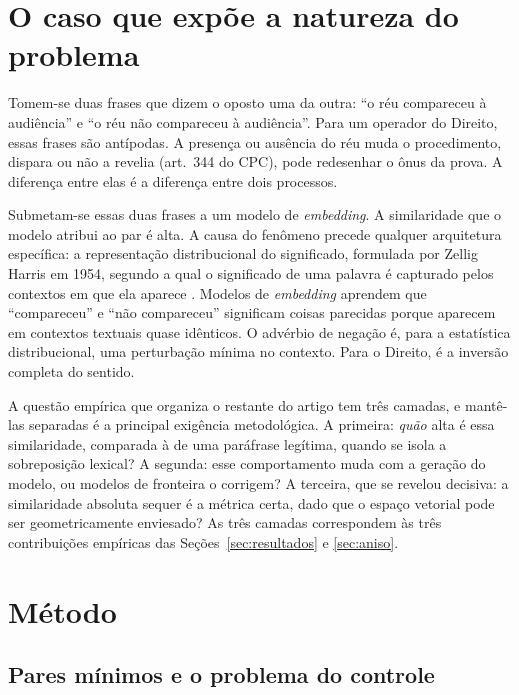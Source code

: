 \documentclass[11pt]{article}
\begin{document}
\section{O caso que expõe a natureza do problema}
\label{sec:caso}

Tomem-se duas frases que dizem o oposto uma da outra: ``o réu compareceu à
audiência'' e ``o réu não compareceu à audiência''. Para um operador do Direito,
essas frases são antípodas. A presença ou ausência do réu muda o procedimento,
dispara ou não a revelia (art.~344 do CPC), pode redesenhar o ônus da prova. A
diferença entre elas é a diferença entre dois processos.

Submetam-se essas duas frases a um modelo de \textit{embedding}. A similaridade
que o modelo atribui ao par é alta. A causa do fenômeno precede qualquer
arquitetura específica: a representação distribucional do significado, formulada
por Zellig Harris em 1954, segundo a qual o significado de uma palavra é capturado
pelos contextos em que ela aparece \cite{harris1954}. Modelos de \textit{embedding}
aprendem que ``compareceu'' e ``não compareceu'' significam coisas parecidas
porque aparecem em contextos textuais quase idênticos. O advérbio de negação é,
para a estatística distribucional, uma perturbação mínima no contexto. Para o
Direito, é a inversão completa do sentido.

A questão empírica que organiza o restante do artigo tem três camadas, e
mantê-las separadas é a principal exigência metodológica. A primeira: \emph{quão}
alta é essa similaridade, comparada à de uma paráfrase legítima, quando se isola a
sobreposição lexical? A segunda: esse comportamento muda com a geração do modelo,
ou modelos de fronteira o corrigem? A terceira, que se revelou decisiva: a
similaridade absoluta sequer é a métrica certa, dado que o espaço vetorial pode
ser geometricamente enviesado? As três camadas correspondem às três contribuições
empíricas das Seções~\ref{sec:resultados} e \ref{sec:aniso}.

\section{Método}
\label{sec:metodo}

\subsection{Pares mínimos e o problema do controle}
\end{document}

